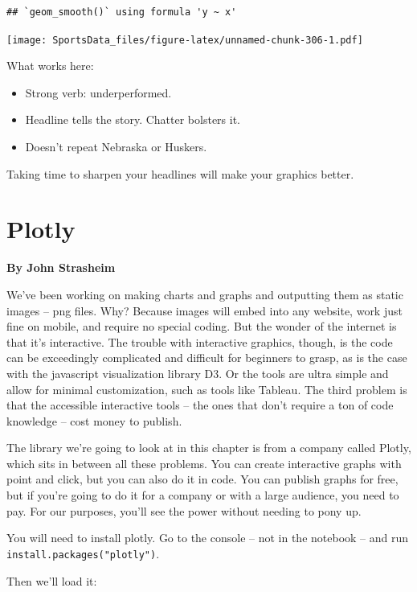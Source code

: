 \documentclass[
]{book}
\providecommand{\tightlist}{%
  \setlength{\itemsep}{0pt}\setlength{\parskip}{0pt}}
\begin{document}
\begin{verbatim}
## `geom_smooth()` using formula 'y ~ x'
\end{verbatim}

\texttt{[image: SportsData\_files/figure-latex/unnamed-chunk-306-1.pdf]}

What works here:

\begin{itemize}
\tightlist
\item
  Strong verb: underperformed.
\item
  Headline tells the story. Chatter bolsters it.
\item
  Doesn't repeat Nebraska or Huskers.
\end{itemize}

Taking time to sharpen your headlines will make your graphics better.

\hypertarget{plotly}{%
\chapter{Plotly}\label{plotly}}

\textbf{By John Strasheim}

We've been working on making charts and graphs and outputting them as static images -- png files. Why? Because images will embed into any website, work just fine on mobile, and require no special coding. But the wonder of the internet is that it's interactive. The trouble with interactive graphics, though, is the code can be exceedingly complicated and difficult for beginners to grasp, as is the case with the javascript visualization library D3. Or the tools are ultra simple and allow for minimal customization, such as tools like Tableau. The third problem is that the accessible interactive tools -- the ones that don't require a ton of code knowledge -- cost money to publish.

The library we're going to look at in this chapter is from a company called Plotly, which sits in between all these problems. You can create interactive graphs with point and click, but you can also do it in code. You can publish graphs for free, but if you're going to do it for a company or with a large audience, you need to pay. For our purposes, you'll see the power without needing to pony up.

You will need to install plotly. Go to the console -- not in the notebook -- and run \texttt{install.packages("plotly")}.

Then we'll load it:
\end{document}
